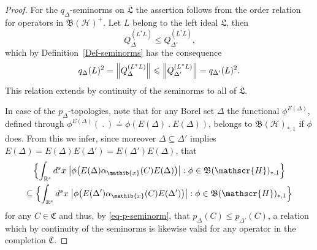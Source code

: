 \documentclass[11pt,twoside,openright]{report}
\theoremstyle{definition}
\theoremstyle{plain}
\theoremstyle{remark}
\theoremstyle{assumption}
\newcommand{\Bset}[1]{\Bigl\{ #1 \Bigr\}}
\newcommand{\babs}[1]{\bigl\lvert #1 \bigr\rvert}
\newcommand{\Bnorm}[1]{\Bigl\lVert #1 \Bigr\rVert}
\newcommand{\pD}{p_\Delta}
\newcommand{\pDx}[1]{p_\Delta ( #1 )}
\newcommand{\pDprimex}[1]{p_{\Delta'} ( #1 )}
\newcommand{\qD}{q_\Delta}
\newcommand{\qDx}[1]{q_\Delta ( #1 )}
\newcommand{\qDprimex}[1]{q_{\Delta'} ( #1 )}
\newcommand{\Cfrak}{\mathfrak{C}}
\newcommand{\Lfrak}{\mathfrak{L}}
\newcommand{\Rs}{\mathbb{R}^s}
\newcommand{\Cfrakbar}{\overline{\mathfrak{C}}}
\newcommand{\Lfrakbar}{\overline{\mathfrak{L}}}
\newcommand{\BH}{\mathfrak{B} ( \mathscr{H} )}
\newcommand{\ED}{E ( \Delta )}
\newcommand{\EDprime}{E ( \Delta' )}
\newcommand{\aibx}{\alpha_\mathib{x}}
\begin{document}
\begin{proof}
  For the $\qD$-seminorms on $\Lfrakbar$ the assertion follows from
  the order relation for operators in $\BH^+$. Let $L$ belong to the
  left ideal $\Lfrak$, then
  \begin{equation*}
    Q_\Delta^{( L^* L )} \leqslant Q_{\Delta'}^{( L^* L )} \text{,}
  \end{equation*}
  which by Definition~\ref{Def-seminorms} has the consequence
  \begin{equation*}
    \qDx{L}^2 = \Bnorm{Q_\Delta^{( L^* L )}} \leqslant
    \Bnorm{Q_{\Delta'}^{( L^* L )}} = \qDprimex{L}^2 \text{.}
  \end{equation*}
  This relation extends by continuity of the seminorms to all of
  $\Lfrakbar$. 

  In case of the $\pD$-topologies, note that for any Borel set
  $\Delta$ the functional $\phi^{\ED}$, defined through $\phi^{\ED}
  (~.~) \doteq \phi (\ED~.~\ED)$, belongs to $\BH_{*,1}$ if $\phi$
  does. From this we infer, since moreover $\Delta \subseteq \Delta'$
  implies $\ED = \ED \EDprime = \EDprime \ED$, that
  \begin{multline*}
    \Bset{\int_{\Rs} d^s x \; \babs{\phi \bigl( \ED \aibx( C ) \ED
    \bigr)} : \phi \in \BH_{*,1}} \\ 
    \subseteq \Bset{\int_{\Rs} d^s x \; \babs{\phi \bigl( \EDprime
    \aibx( C ) \EDprime \bigr)} : \phi \in \BH_{*,1}}  
  \end{multline*}
  for any $C \in \Cfrak$ and thus, by \eqref{eq-p-seminorm}, that
  $\pDx{C} \leqslant \pDprimex{C}$, a relation which by continuity of
  the seminorms is likewise valid for any operator in the completion
  $\Cfrakbar$.
\end{proof}
\end{document}
